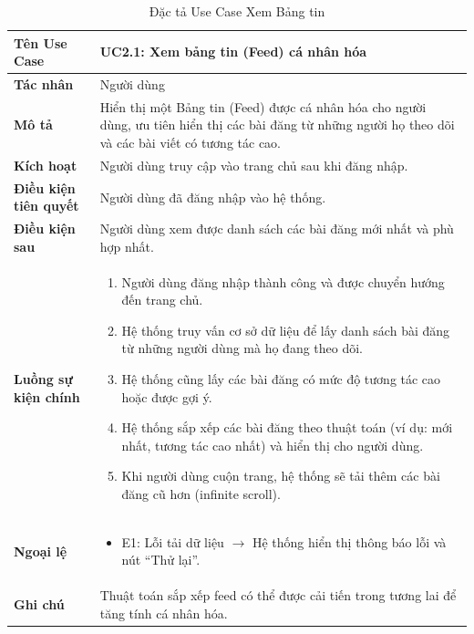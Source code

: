 \begin{table}[H]
\centering
\begin{tabularx}{\textwidth}{|l|X|}
\hline
\textbf{Tên Use Case} & \textbf{UC2.1: Xem bảng tin (Feed) cá nhân hóa} \\ \hline
\textbf{Tác nhân} & Người dùng \\ \hline
\textbf{Mô tả} & Hiển thị một Bảng tin (Feed) được cá nhân hóa cho người dùng, ưu tiên hiển thị các bài đăng từ những người họ theo dõi và các bài viết có tương tác cao. \\ \hline
\textbf{Kích hoạt} & Người dùng truy cập vào trang chủ sau khi đăng nhập. \\ \hline
\textbf{Điều kiện tiên quyết} & Người dùng đã đăng nhập vào hệ thống. \\ \hline
\textbf{Điều kiện sau} & Người dùng xem được danh sách các bài đăng mới nhất và phù hợp nhất. \\ \hline
\textbf{Luồng sự kiện chính} & 
\begin{enumerate}
    \item Người dùng đăng nhập thành công và được chuyển hướng đến trang chủ.
    \item Hệ thống truy vấn cơ sở dữ liệu để lấy danh sách bài đăng từ những người dùng mà họ đang theo dõi.
    \item Hệ thống cũng lấy các bài đăng có mức độ tương tác cao hoặc được gợi ý.
    \item Hệ thống sắp xếp các bài đăng theo thuật toán (ví dụ: mới nhất, tương tác cao nhất) và hiển thị cho người dùng.
    \item Khi người dùng cuộn trang, hệ thống sẽ tải thêm các bài đăng cũ hơn (infinite scroll).
\end{enumerate} \\ \hline
\textbf{Ngoại lệ} & 
\begin{itemize}
    \item E1: Lỗi tải dữ liệu $\rightarrow$ Hệ thống hiển thị thông báo lỗi và nút ``Thử lại''.
\end{itemize} \\ \hline
\textbf{Ghi chú} & Thuật toán sắp xếp feed có thể được cải tiến trong tương lai để tăng tính cá nhân hóa. \\ \hline
\end{tabularx}
\caption{Đặc tả Use Case Xem Bảng tin}
\end{table}

